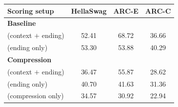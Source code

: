 \begin{tabular}{lccc}
\toprule
\textbf{Scoring setup} & \textbf{HellaSwag} & \textbf{ARC-E} & \textbf{ARC-C} \\
\midrule
\textbf{Baseline} \\
(context $+$ ending)    & 52.41 & 68.72 & 36.66 \\
(ending only)           & 53.30 & 53.88 & 40.29 \\
\midrule
\textbf{Compression} \\

(context $+$ ending) & 36.47 & 55.87 & 28.62 \\
(ending only)        & 40.70 & 41.63 & 31.36 \\
(compression only)        & 34.57 & 30.92 & 22.94 \\
\bottomrule
\end{tabular}
